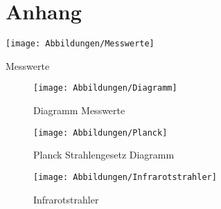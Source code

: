 \documentclass[a4paper]{scrartcl}
\numberwithin{equation}{subsection}
\begin{document}
\newpage
\section{Anhang}
\label{sec:Anhang}

\begin{table}[H]
\texttt{[image: Abbildungen/Messwerte]}
\centering
\caption{Messwerte}
\centering
\label{tab:Messwerte}
\end{table}

\begin{figure}[H]
\texttt{[image: Abbildungen/Diagramm]}
\centering
\caption{Diagramm Messwerte}
\centering
\label{fig:Diagramm}
\end{figure}

\begin{figure}[H]
\texttt{[image: Abbildungen/Planck]}
\centering
\caption{Planck Strahlengesetz Diagramm}
\centering
\end{figure}

\begin{figure}[H]
\texttt{[image: Abbildungen/Infrarotstrahler]}
\centering
\caption{Infrarotstrahler}
\centering
\label{fig:IR}
\end{figure}

\newpage


\label{LastPage}
\end{document}
